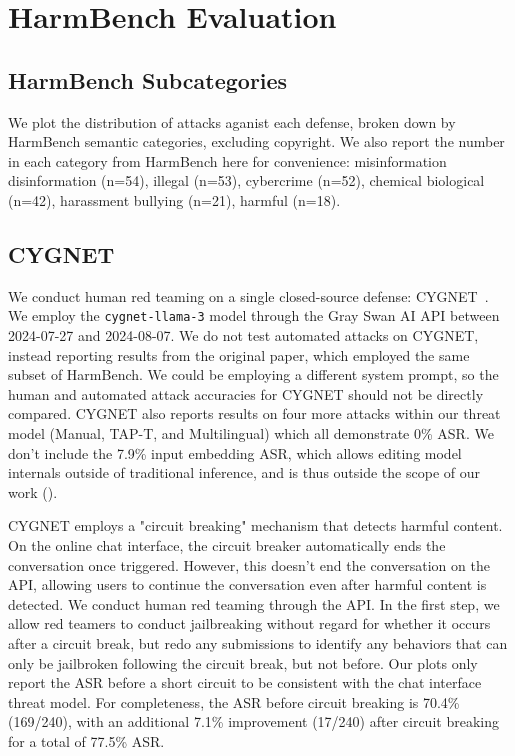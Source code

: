 \section{HarmBench Evaluation}\label{app:harmbench-evaluation}


\subsection{HarmBench Subcategories}\label{app:subcategory}
We plot the distribution of attacks aganist each defense, broken down by HarmBench semantic categories, excluding copyright. We also report the number in each category from HarmBench here for convenience: misinformation disinformation (n=54), illegal (n=53), cybercrime (n=52), chemical biological (n=42), harassment bullying (n=21), harmful (n=18).



\subsection{CYGNET}\label{app:harmbench-evaluation-cygnet}
We conduct human red teaming on a single closed-source defense: CYGNET~\citep{zou2024improvingalignmentrobustnesscircuit}. We employ the \verb|cygnet-llama-3| model through the Gray Swan AI API between 2024-07-27 and 2024-08-07. We do not test automated attacks on CYGNET, instead reporting results from the original paper, which employed the same subset of HarmBench. We could be employing a different system prompt, so the human and automated attack accuracies for CYGNET should not be directly compared. CYGNET also reports results on four more attacks within our threat model (Manual, TAP-T, and Multilingual) which all demonstrate 0\% ASR. We don't include the 7.9\% input embedding ASR, which allows editing model internals outside of traditional inference, and is thus outside the scope of our work ().

CYGNET employs a "circuit breaking" mechanism that detects harmful content. On the online chat interface, the circuit breaker automatically ends the conversation once triggered. However, this doesn't end the conversation on the API, allowing users to continue the conversation even after harmful content is detected. We conduct human red teaming through the API. In the first step, we allow red teamers to conduct jailbreaking without regard for whether it occurs after a circuit break, but redo any submissions to identify any behaviors that can only be jailbroken following the circuit break, but not before. Our plots only report the ASR before a short circuit to be consistent with the chat interface threat model. For completeness, the ASR before circuit breaking is 70.4\% (169/240), with an additional 7.1\% improvement (17/240) after circuit breaking for a total of 77.5\% ASR.

